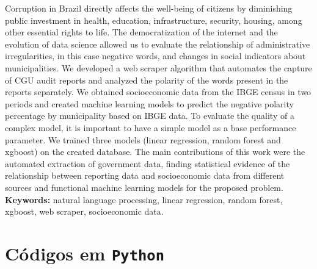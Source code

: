 \documentclass[12pt,twoside,a4paper]{book}
\renewcommand{\chaptermark}[1]{\markboth{\MakeUppercase{#1}}{}}
\begin{document}
Corruption in Brazil directly affects the well-being of citizens by diminishing public investment in health, education, infrastructure, security, housing, among other essential rights to life. The democratization of the internet and the evolution of data science allowed us to evaluate the relationship of administrative irregularities, in this case negative words, and changes in social indicators about municipalities. We developed a web scraper algorithm that automates the capture of CGU audit reports and analyzed the polarity of the words present in the reports separately. We obtained socioeconomic data from the IBGE census in two periods and created machine learning models to predict the negative polarity percentage by municipality based on IBGE data. To evaluate the quality of a complex model, it is important to have a simple model as a base performance parameter. We trained three models (linear regression, random forest and xgboost) on the created database. The main contributions of this work were the automated extraction of government data, finding statistical evidence of the relationship between reporting data and socioeconomic data from different sources and functional machine learning models for the proposed problem.
\\

\noindent \textbf{Keywords:} natural language processing, linear regression, random forest, xgboost, web scraper, socioeconomic data.

\tableofcontents    %

\mainmatter

\fancyhead[RE,LO]{\thesection}

\singlespacing              %


\renewcommand{\chaptermark}[1]{\markboth{\MakeUppercase{\appendixname\ \thechapter}} {\MakeUppercase{#1}} }
\fancyhead[RE,LO]{}
\appendix

\chapter{Códigos em \tt{Python}}
\label{ape:codigos}
\end{document}
